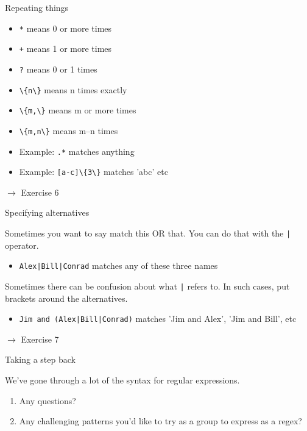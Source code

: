 \documentclass{beamer}
\begin{document}
\begin{frame}{Repeating things}

\begin{itemize}
 \item \lstinline$*$ means 0 or more times
 \item \lstinline$+$ means 1 or more times
 \item \lstinline$?$ means 0 or 1 times
 \item \lstinline$\{n\}$ means n times exactly
 \item \lstinline$\{m,\}$ means m or more times
 \item \lstinline$\{m,n\}$ means m--n times
 \item Example: \lstinline$.*$ matches anything
 \item Example: \lstinline$[a-c]\{3\}$ matches 'abc' etc
\end{itemize}

\bigskip
$\rightarrow$ Exercise 6

\end{frame}

\begin{frame}{Specifying alternatives}

Sometimes you want to say match this OR that.
You can do that with the \lstinline$|$ operator.

\begin{itemize}
  \item \lstinline$Alex|Bill|Conrad$ matches any of these three names
\end{itemize}

Sometimes there can be confusion about what \lstinline$|$ refers to.
In such cases, put brackets around the alternatives.

\begin{itemize}
  \item \lstinline$Jim and (Alex|Bill|Conrad)$ matches 'Jim and Alex', 'Jim and Bill', etc
\end{itemize}

\bigskip
$\rightarrow$ Exercise 7

\end{frame}

\begin{frame}{Taking a step back}

We've gone through a lot of the syntax for regular expressions.

\begin{enumerate}
  \item Any questions?
  \item Any challenging patterns you'd like to try as a group to express as a regex?
\end{enumerate}
\end{frame}
\end{document}
